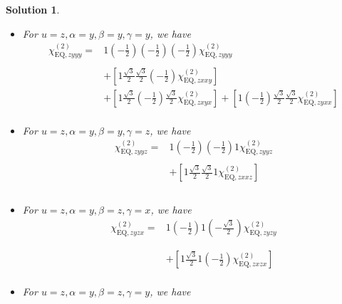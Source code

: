 \documentclass[UTF8,10pt,a4paper]{article}
\theoremstyle{Problem}
\theoremstyle{Solution}
\newtheorem*{sol}{Solution}
\begin{document}
\begin{sol}
\begin{itemize}
\begin{align}
\nonumber&+\left[1\frac{\sqrt{3}}{2}\left(-\frac{1}{2}\right)\left(-\frac{1}{2}\right)\chi_{\text{EQ},zxyx}^{(2)}\right]+\left[1\left(-\frac{1}{2}\right)\frac{\sqrt{3}}{2}\left(-\frac{1}{2}\right)\chi_{\text{EQ},zyxx}^{(2)}\right]\\
&
\end{align}\normalsize
\item For $u=z,\alpha=y,\beta=y,\gamma=y$, we have
\footnotesize\begin{align}
\nonumber\chi_{\text{EQ},zyyy}^{(2)}=&1\left(-\frac{1}{2}\right)\left(-\frac{1}{2}\right)\left(-\frac{1}{2}\right)\chi_{\text{EQ},zyyy}^{(2)}\\
\nonumber&\\
\nonumber&+\left[1\frac{\sqrt{3}}{2}\frac{\sqrt{3}}{2}\left(-\frac{1}{2}\right)\chi_{\text{EQ},zxxy}^{(2)}\right]\\
\nonumber&+\left[1\frac{\sqrt{3}}{2}\left(-\frac{1}{2}\right)\frac{\sqrt{3}}{2}\chi_{\text{EQ},zxyx}^{(2)}\right]+\left[1\left(-\frac{1}{2}\right)\frac{\sqrt{3}}{2}\frac{\sqrt{3}}{2}\chi_{\text{EQ},zyxx}^{(2)}\right]\\
&
\end{align}\normalsize
\item For $u=z,\alpha=y,\beta=y,\gamma=z$, we have
\footnotesize\begin{align}
\nonumber\chi_{\text{EQ},zyyz}^{(2)}=&1\left(-\frac{1}{2}\right)\left(-\frac{1}{2}\right)1\chi_{\text{EQ},zyyz}^{(2)}\\
\nonumber&\\
\nonumber&+\left[1\frac{\sqrt{3}}{2}\frac{\sqrt{3}}{2}1\chi_{\text{EQ},zxxz}^{(2)}\right]\\
\nonumber&\\
&
\end{align}\normalsize
\item For $u=z,\alpha=y,\beta=z,\gamma=x$, we have
\footnotesize\begin{align}
\nonumber\chi_{\text{EQ},zyzx}^{(2)}=&1\left(-\frac{1}{2}\right)1\left(-\frac{\sqrt{3}}{2}\right)\chi_{\text{EQ},zyzy}^{(2)}\\
\nonumber&\\
\nonumber&\\
\nonumber&+\left[1\frac{\sqrt{3}}{2}1\left(-\frac{1}{2}\right)\chi_{\text{EQ},zxzx}^{(2)}\right]\\
&
\end{align}\normalsize
\item For $u=z,\alpha=y,\beta=z,\gamma=y$, we have
\footnotesize\begin{align}

\end{align}
\end{itemize}
\end{sol}
\end{document}

